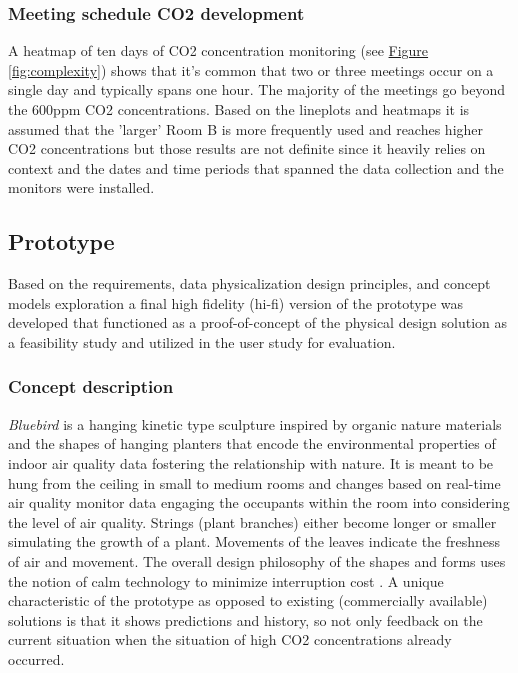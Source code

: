 \subsubsection{Meeting schedule CO2 development}

A heatmap of ten days of CO2 concentration monitoring (see \hyperref[fig:complexity]{Figure \ref*{fig:complexity}}) shows that it's common that two or three meetings occur on a single day and typically spans one hour. The majority of the meetings go beyond the 600ppm CO2 concentrations. Based on the lineplots and heatmaps it is assumed that the 'larger' Room B is more frequently used and reaches higher CO2 concentrations but those results are not definite since it heavily relies on context and the dates and time periods that spanned the data collection and the monitors were installed.

\subsection{Prototype}
\label{sec:prototype_results}

Based on the requirements, data physicalization design principles, and concept models exploration a final high fidelity (hi-fi) version of the prototype was developed that functioned as a proof-of-concept of the physical design solution as a feasibility study and utilized in the user study for evaluation.

\subsubsection{Concept description}

\textit{Bluebird} is a hanging kinetic type sculpture inspired by organic nature materials and the shapes of hanging planters that encode the environmental properties of indoor air quality data fostering the relationship with nature. It is meant to be hung from the ceiling in small to medium rooms and changes based on real-time air quality monitor data engaging the occupants within the room into considering the level of air quality. Strings (plant branches) either become longer or smaller simulating the growth of a plant. Movements of the leaves indicate the freshness of air and movement. The overall design philosophy of the shapes and forms uses the notion of calm technology to minimize interruption cost \cite{case_calm_2016}. A unique characteristic of the prototype as opposed to existing (commercially available) solutions is that it shows predictions and history, so not only feedback on the current situation when the situation of high CO2 concentrations already occurred.


